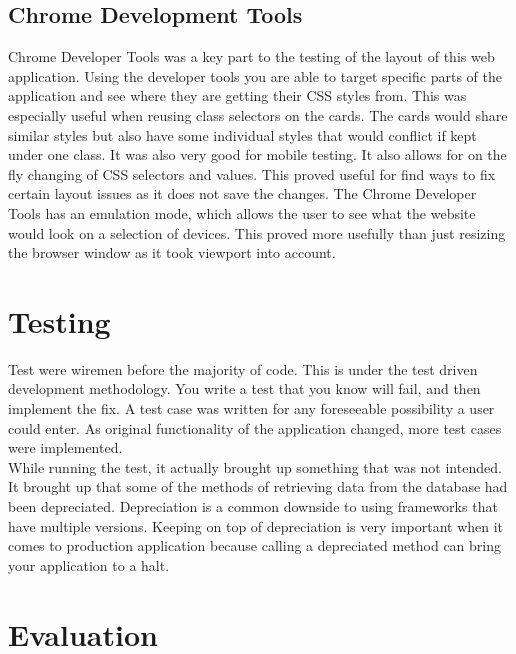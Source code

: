 \subsection{Chrome Development Tools}
Chrome Developer Tools \citep{cdt:2014} was a key part to the testing of the layout of this web application. Using the developer tools you are able to target specific parts of the application and see where they are getting their CSS styles from. This was especially useful when reusing class selectors on the cards. The cards would share similar styles but also have some individual styles that would conflict if kept under one class. It was also very good for mobile testing. It also allows for on the fly changing of CSS selectors and values. This proved useful for find ways to fix certain layout issues as it does not save the changes. The Chrome Developer Tools has an emulation mode, which allows the user to see what the website would look on a selection of devices. This proved more usefully than just resizing the browser window as it took viewport into account. \\

\section{Testing}
Test were wiremen before the majority of code. This is under the test driven development methodology. You write a test that you know will fail, and then implement the fix. A test case was written for any foreseeable possibility a user could enter. As original functionality of the application changed, more test cases were implemented.\\

While running the test, it actually brought up something that was not intended. It brought up that some of the methods of retrieving data from the database had been depreciated. Depreciation is a common downside to using frameworks that have multiple versions. Keeping on top of depreciation is very important when it comes to production application because calling a depreciated method can bring your application to a halt.

\section{Evaluation}
